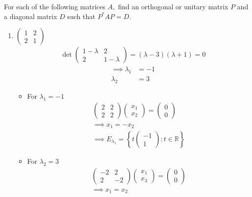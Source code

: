 For each of the following matrices $A,$ find an orthogonal or unitary
matrix $P$ and a diagonal matrix $D$ such that $P^*AP = D.$ 
\begin{enumerate}
\item $\begin{pmatrix} 1 & 2 \\ 2 &1 \end{pmatrix}$
\begin{gather}
\det{
\begin{pmatrix}
1-\lambda & 2\\
2 & 1 -\lambda
\end{pmatrix}
}=(\lambda-3)(\lambda+1) = 0
\end{gather}
\begin{align}
\implies \lambda_1 &= -1\\
\lambda_2 &= 3
\end{align}
\begin{itemize}
\item For $\lambda_1 = -1$
\begin{gather}
\begin{pmatrix}
2 & 2\\
2 & 2
\end{pmatrix}
\begin{pmatrix}
x_1\\
x_2
\end{pmatrix}
=
\begin{pmatrix}
0\\
0
\end{pmatrix}\\
\implies x_1 = -x_2\\
\implies E_{\lambda_1} = \left\{
t\begin{pmatrix}-1\\1\end{pmatrix}\colon t\in \mathbb{R}
\right\}
\end{gather}
\item For $\lambda_2 = 3$
\begin{gather}
\begin{pmatrix}
-2 & 2 \\
2 & -2
\end{pmatrix}
\begin{pmatrix}
x_1\\
x_3
\end{pmatrix}
=
\begin{pmatrix}
0\\
0
\end{pmatrix}\\
\implies x_1 = x_2\\

\end{gather}
\end{itemize}
\end{enumerate}
